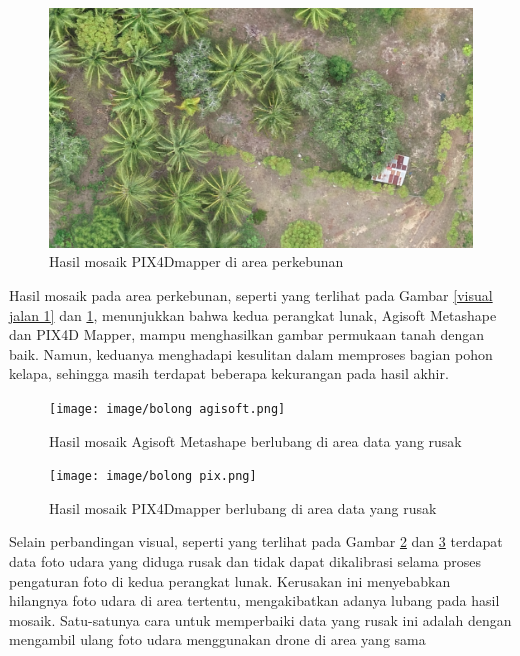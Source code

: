 \begin{figure} [H]
    \centering
    \includegraphics [width=1\linewidth]{image/jalan pix.png}
    \caption{Hasil mosaik PIX4Dmapper di area perkebunan}
    \label{visual jalan 2}
\end{figure}

Hasil mosaik pada area perkebunan, seperti yang terlihat pada Gambar \ref{visual jalan 1} dan \ref{visual jalan 2}, menunjukkan bahwa kedua perangkat lunak, Agisoft Metashape dan PIX4D Mapper, mampu menghasilkan gambar permukaan tanah dengan baik. Namun, keduanya menghadapi kesulitan dalam memproses bagian pohon kelapa, sehingga masih terdapat beberapa kekurangan pada hasil akhir.

\begin{figure} [H]
    \centering
    \texttt{[image: image/bolong agisoft.png]}
    \caption{Hasil mosaik Agisoft Metashape berlubang di area data yang rusak}
    \label{visual bolong 1}
\end{figure}

\begin{figure} [H]
    \centering
    \texttt{[image: image/bolong pix.png]}
    \caption{Hasil mosaik PIX4Dmapper berlubang di area data yang rusak}
    \label{visual bolong 2}
\end{figure}

Selain perbandingan visual, seperti yang terlihat pada Gambar \ref{visual bolong 1} dan \ref{visual bolong 2} terdapat data foto udara yang diduga rusak dan tidak dapat dikalibrasi selama proses pengaturan foto di kedua perangkat lunak. Kerusakan ini menyebabkan hilangnya foto udara di area tertentu, mengakibatkan adanya lubang pada hasil mosaik. Satu-satunya cara untuk memperbaiki data yang rusak ini adalah dengan mengambil ulang foto udara menggunakan drone di area yang sama

